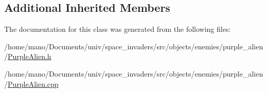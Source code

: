 \subsection*{Additional Inherited Members}


The documentation for this class was generated from the following files\+:\begin{DoxyCompactItemize}
\item 
/home/mano/\+Documents/univ/space\+\_\+invaders/src/objects/enemies/purple\+\_\+alien/\hyperlink{PurpleAlien_8h}{Purple\+Alien.\+h}\item
/home/mano/\+Documents/univ/space\+\_\+invaders/src/objects/enemies/purple\+\_\+alien/\hyperlink{PurpleAlien_8cpp}{Purple\+Alien.\+cpp}\end{DoxyCompactItemize}
